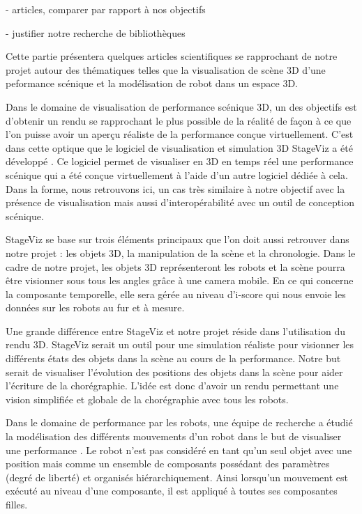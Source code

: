 - articles, comparer par rapport à nos objectifs 

- justifier notre recherche de bibliothèques

Cette partie présentera quelques articles scientifiques se rapprochant de notre projet autour des thématiques telles que la visualisation de scène 3D d'une peformance scénique et la modélisation de robot dans un espace 3D. 

Dans le domaine de visualisation de performance scénique 3D, un des objectifs est d'obtenir un rendu se rapprochant le plus possible de la réalité de façon à ce que l'on puisse avoir un aperçu réaliste de la performance conçue virtuellement. C'est dans cette optique que le logiciel de visualisation et simulation 3D StageViz\cite{StageViz} a été développé . Ce logiciel permet de visualiser en 3D en temps réel une performance scénique qui a été conçue virtuellement à l'aide d'un autre logiciel dédiée à cela. Dans la forme, nous retrouvons ici, un cas très similaire à notre objectif avec la présence de visualisation mais aussi d'interopérabilité avec un outil de conception scénique.

StageViz se base sur trois éléments principaux que l'on doit aussi retrouver dans notre projet : les objets 3D, la manipulation de la scène et la chronologie. Dans le cadre de notre projet, les objets 3D représenteront les robots et la scène pourra être visionner sous tous les angles grâce à une camera mobile. En ce qui concerne la composante temporelle, elle sera gérée au niveau d'i-score qui nous envoie les données sur les robots au fur et à mesure. 

Une grande différence entre StageViz et notre projet réside dans l'utilisation du rendu 3D. StageViz serait un outil pour une simulation réaliste pour visionner les différents états des objets dans la scène au cours de la performance. Notre but serait de visualiser l'évolution des positions des objets dans la scène pour aider l'écriture de la chorégraphie. L'idée est donc d'avoir un rendu permettant une vision simplifiée et globale de la chorégraphie avec tous les robots.

Dans le domaine de performance par les robots, une équipe de recherche a étudié la modélisation des différents mouvements d'un robot dans le but de visualiser une performance \cite{robotArt}. Le robot n'est pas considéré en tant qu'un seul objet avec une position mais comme un ensemble de composants possédant des paramètres (degré de liberté) et organisés hiérarchiquement. Ainsi lorsqu'un mouvement est exécuté au niveau d'une composante, il est appliqué à toutes ses composantes filles.
